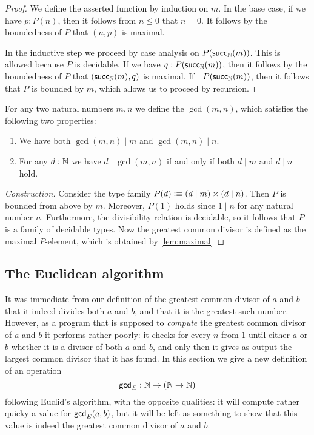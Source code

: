 \begin{proof}
  We define the asserted function by induction on $m$. In the base case, if we have $p:P(n)$, then it follows from $n\leq 0$ that $n=0$. It follows by the boundedness of $P$ that $(n,p)$ is maximal.

  In the inductive step we proceed by case analysis on $P(\mathsf{succ}_{{\mathbb{N}}}(m))$. This is allowed because $P$ is decidable. If we have $q:P(\mathsf{succ}_{{\mathbb{N}}}(m))$, then it follows by the boundedness of $P$ that $(\mathsf{succ}_{{\mathbb{N}}}(m),q)$ is maximal. If $\neg P(\mathsf{succ}_{{\mathbb{N}}}(m))$, then it follows that $P$ is bounded by $m$, which allows us to proceed by recursion.
\end{proof}

\begin{defn}
  For any two natural numbers $m,n$ we define the  $\gcd(m,n)$, which satisfies the following two properties:
  \begin{enumerate}
  \item We have both $\gcd(m,n)\mid m$ and $\gcd(m,n)\mid n$.
  \item For any $d:{\mathbb{N}}$ we have $d\mid \gcd(m,n)$ if and only if both $d\mid m$ and $d\mid n$ hold.
  \end{enumerate}
\end{defn}

\begin{proof}[Construction]
  Consider the type family $P(d)\vcentcolon\equiv (d\mid m)\times (d\mid n)$. Then $P$ is bounded from above by $m$. Moreover, $P(1)$ holds since $1\mid n$ for any natural number $n$. Furthermore, the divisibility relation is decidable, so it follows that $P$ is a family of decidable types. Now the greatest common divisor is defined as the maximal $P$-element, which is obtained by \cref{lem:maximal}
\end{proof}

\subsection{The Euclidean algorithm}

It was immediate from our definition of the greatest common divisor of $a$ and $b$ that it indeed divides both $a$ and $b$, and that it is the greatest such number. However, as a program that is supposed to \emph{compute} the greatest common divisor of $a$ and $b$ it performs rather poorly: it checks for every $n$ from $1$ until either $a$ or $b$ whether it is a divisor of both $a$ and $b$, and only then it gives as output the largest common divisor that it has found. In this section we give a new definition of an operation
\begin{equation*}
  \mathsf{gcd}_E:{\mathbb{N}} \to ({\mathbb{N}} \to {\mathbb{N}})
\end{equation*}
following Euclid's algorithm, with the opposite qualities: it will compute rather quicky a value for $\mathsf{gcd}_E(a,b)$, but it will be left as something to show that this value is indeed the greatest common divisor of $a$ and $b$.

